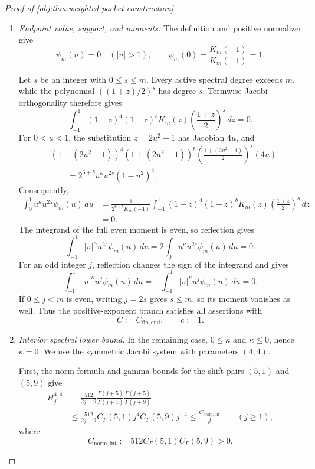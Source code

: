 \begin{proof}[Proof of \cref{obj:thm:weighted-packet-construction}]
\begin{enumerate}
\item \emph{Endpoint value, support, and moments.}
The definition and positive normalizer give
\[
\psi_m(u)=0\quad(|u|>1),
\qquad
\psi_m(0)=\frac{K_m(-1)}{K_m(-1)}=1.
\]

Let \(s\) be an integer with \(0\le s\le m\). Every active spectral degree exceeds \(m\), while the polynomial
\(((1+z)/2)^s\) has degree \(s\). Termwise Jacobi orthogonality therefore gives
\[
\int_{-1}^1
(1-z)^4(1+z)^bK_m(z)
\left(\frac{1+z}{2}\right)^s\,dz=0.
\]
For \(0<u<1\), the substitution \(z=2u^2-1\) has Jacobian \(4u\), and
\[
\begin{split}
&(1-(2u^2-1))^4(1+(2u^2-1))^b
\left(\frac{1+(2u^2-1)}2\right)^s(4u)\\
&\qquad=
2^{6+b}u^\kappa u^{2s}(1-u^2)^4.
\end{split}
\]
Consequently,
\[
\begin{split}
\int_0^1u^\kappa u^{2s}\psi_m(u)\,du
&=
\frac1{2^{6+b}K_m(-1)}
\int_{-1}^1
(1-z)^4(1+z)^bK_m(z)
\left(\frac{1+z}{2}\right)^s\,dz\\
&=0.
\end{split}
\]
The integrand of the full even moment is even, so reflection gives
\[
\int_{-1}^1|u|^\kappa u^{2s}\psi_m(u)\,du
=
2\int_0^1u^\kappa u^{2s}\psi_m(u)\,du=0.
\]
For an odd integer \(j\), reflection changes the sign of the integrand and gives
\[
\int_{-1}^1|u|^\kappa u^j\psi_m(u)\,du
=
-\int_{-1}^1|u|^\kappa u^j\psi_m(u)\,du
=0.
\]
If \(0\le j<m\) is even, writing \(j=2s\) gives \(s\le m\), so its moment vanishes as well. Thus the positive-exponent branch satisfies all assertions with
\[
C:=C_{\mathrm{fin,end}},
\qquad c:=1.
\]

\item \emph{Interior spectral lower bound.}
In the remaining case, \(0\le\kappa\) and \(\kappa\le0\), hence \(\kappa=0\). We use the symmetric Jacobi system with parameters \((4,4)\).

First, the norm formula and gamma bounds for the shift pairs \((5,1)\) and \((5,9)\) give
\[
\begin{split}
H_j^{4,4}
&=
\frac{512}{2j+9}
\frac{\Gamma(j+5)}{\Gamma(j+1)}
\frac{\Gamma(j+5)}{\Gamma(j+9)}\\
&\le
\frac{512}{2j+9}
C_\Gamma(5,1)j^4 C_\Gamma(5,9)j^{-4}
\le\frac{C_{\mathrm{norm,int}}}{j}
\qquad(j\ge1),
\end{split}
\]
where
\[
C_{\mathrm{norm,int}}
:=512C_\Gamma(5,1)C_\Gamma(5,9)>0.
\]


\end{enumerate}
\end{proof}
